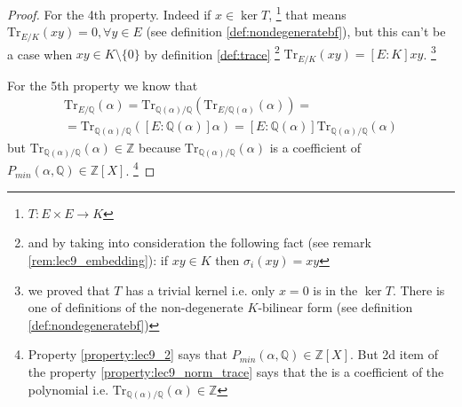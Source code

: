\begin{property}
\begin{proof}
    For the 4th property. Indeed if $x \in \ker T$,
    \footnote{
      $T: E \times E \to K$
    }
    that means 
    $\mathrm{Tr}_{E/K}\left(xy\right) = 0, \forall y \in E$ (see
    definition \ref{def:nondegeneratebf}), but this
    can't be a case when $xy \in K \setminus \{0\}$ by definition
    \ref{def:trace}
    \footnote{
      and by taking into consideration the following fact
      (see remark \ref{rem:lec9_embedding}):
      if $xy \in K$
      then $\sigma_i(xy) = xy$ 
    }
    $\mathrm{Tr}_{E/K}\left(xy\right) =
    \left[E:K\right] xy$.
    \footnote{
      we proved that $T$ has a trivial kernel i.e. only $x = 0$ is in
      the $\ker T$. There is one of definitions of the non-degenerate
      $K$-bilinear form (see definition \ref{def:nondegeneratebf}) 
    }

    For the 5th property we know that
    \begin{eqnarray}
    \mathrm{Tr}_{E/\mathbb{Q}}\left(\alpha\right) =
    \mathrm{Tr}_{\mathbb{Q}(\alpha)/\mathbb{Q}}\left(
    \mathrm{Tr}_{E/\mathbb{Q}(\alpha)}\left(\alpha\right)
    \right) =
    \nonumber \\
    =
    \mathrm{Tr}_{\mathbb{Q}(\alpha)/\mathbb{Q}}\left(
    \left[E:\mathbb{Q}(\alpha)\right] \alpha
    \right) =
    \left[E:\mathbb{Q}(\alpha)\right]
    \mathrm{Tr}_{\mathbb{Q}(\alpha)/\mathbb{Q}}\left(
     \alpha
    \right)
    \nonumber
    \end{eqnarray}
    but
    \(
    \mathrm{Tr}_{\mathbb{Q}(\alpha)/\mathbb{Q}}\left(
    \alpha
    \right) \in \mathbb{Z}
    \)
    because
    \(
    \mathrm{Tr}_{\mathbb{Q}(\alpha)/\mathbb{Q}}\left(
    \alpha
    \right)
    \) is a coefficient of $P_{min}\left(\alpha, \mathbb{Q}\right) \in
    \mathbb{Z}\left[X\right]$.
    \footnote{
      Property \ref{property:lec9_2} says that $P_{min}\left(\alpha,
      \mathbb{Q}\right) \in \mathbb{Z}\left[X\right]$. But 2d item of
      the property \ref{property:lec9_norm_trace} says that the
       is a coefficient of the polynomial i.e.
      \(
      \mathrm{Tr}_{\mathbb{Q}(\alpha)/\mathbb{Q}}\left(
      \alpha
      \right) \in \mathbb{Z}
      \)
    }
  \end{proof}
\end{property}

